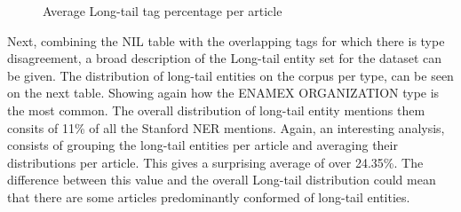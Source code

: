   \begin{figure}[h]
      \label{fig:avglongtailpercentperarticle}
      \centering
      \caption{Average Long-tail tag percentage per article}
  \end{figure}%

Next, combining the NIL table with the overlapping tags for which there is type disagreement, a broad description of the Long-tail entity set for the dataset can be given.
The distribution of long-tail entities on the corpus per type, can be seen on the next table.
Showing again how the ENAMEX ORGANIZATION type is the most common.
The overall distribution of long-tail entity mentions them consits of 11\% of all the Stanford NER mentions.
Again, an interesting analysis, consists of grouping the long-tail entities per article and averaging their distributions per article.
This gives a surprising average of over 24.35\%.
The difference between this value and the overall Long-tail distribution could mean that there are some articles predominantly conformed of long-tail entities.


